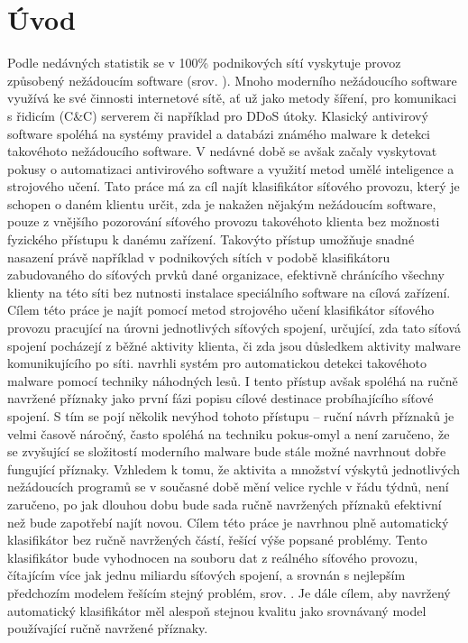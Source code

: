 \chapter*{Úvod}

Podle nedávných statistik se v 100\% podnikových sítí vyskytuje provoz způsobený nežádoucím software (srov. \cite{_cisco_2014}). Mnoho moderního nežádoucího software využívá ke své činnosti internetové sítě, ať už jako metody šíření, pro komunikaci s řidicím (C\&C) serverem či například pro DDoS útoky. Klasický antivirový software spoléhá na systémy pravidel a databázi známého malware k detekci takovéhoto nežádoucího software. V nedávné době se avšak začaly vyskytovat pokusy o automatizaci antivirového software a využití metod umělé inteligence a strojového učení. Tato práce má za cíl najít klasifikátor síťového provozu, který je schopen o daném klientu určit, zda je nakažen nějakým nežádoucím software, pouze z vnějšího pozorování síťového provozu takovéhoto klienta bez možnosti fyzického přístupu k danému zařízení. Takovýto přístup umožňuje snadné nasazení právě například v podnikových sítích v podobě klasifikátoru zabudovaného do síťových prvků dané organizace, efektivně chránícího všechny klienty na této síti bez nutnosti instalace speciálního software na cílová zařízení. Cílem této práce je najít pomocí metod strojového učení klasifikátor síťového provozu pracující na úrovni jednotlivých síťových spojení, určující, zda tato síťová spojení pocházejí z běžné aktivity klienta, či zda jsou důsledkem aktivity malware komunikujícího po síti. \cite{machlica_learning_2017} navrhli systém pro automatickou detekci takovéhoto malware pomocí techniky náhodných lesů. I tento přístup avšak spoléhá na ručně navržené příznaky jako první fázi popisu cílové destinace probíhajícího síťové spojení. S tím se pojí několik nevýhod tohoto přístupu -- ruční návrh příznaků je velmi časově náročný, často spoléhá na techniku pokus-omyl  a není zaručeno, že se zvyšující se složitostí moderního malware bude stále možné navrhnout dobře fungující příznaky. Vzhledem k tomu, že aktivita a množství výskytů jednotlivých nežádoucích programů se v současné době mění velice rychle v řádu týdnů, není zaručeno, po jak dlouhou dobu bude sada ručně navržených příznaků efektivní než bude zapotřebí najít novou. Cílem této práce je navrhnou plně automatický klasifikátor bez ručně navržených částí, řešící výše popsané problémy. Tento klasifikátor bude vyhodnocen na souboru dat z reálného síťového provozu, čítajícím více jak jednu miliardu síťových spojení, a srovnán s nejlepším předchozím modelem řešícím stejný problém, srov. \cite{machlica_learning_2017}. Je dále cílem, aby navržený automatický klasifikátor měl alespoň stejnou kvalitu jako srovnávaný model používající ručně navržené příznaky.

